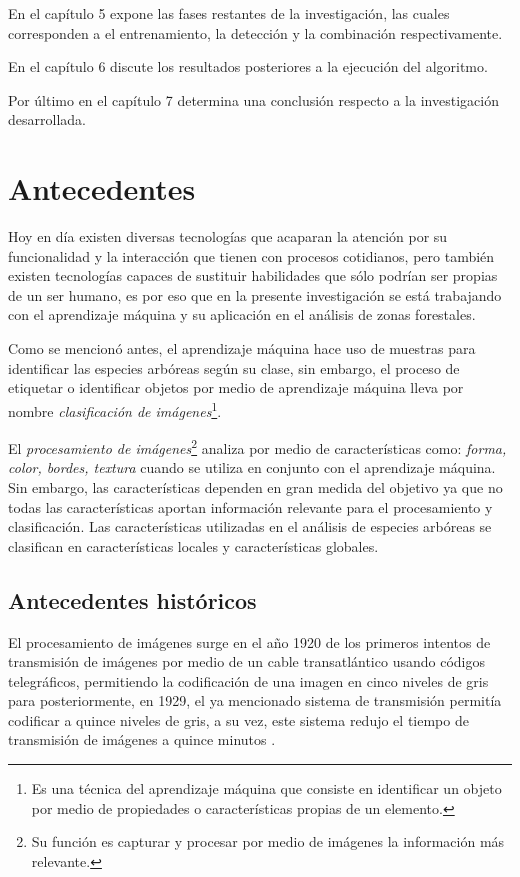 En el capítulo 5 expone las fases restantes de la investigación, las cuales corresponden a el entrenamiento, la detección y la combinación respectivamente.

En el capítulo 6 discute los resultados posteriores a la ejecución del algoritmo.

Por último en el capítulo 7 determina una conclusión respecto a la investigación desarrollada.

\chapter{Antecedentes}
Hoy en día existen diversas tecnologías que acaparan la atención por su funcionalidad y la interacción que tienen con procesos cotidianos, pero también existen tecnologías capaces de sustituir habilidades que sólo podrían ser propias de un ser humano, es por eso que en la presente investigación se está trabajando con el aprendizaje máquina y su aplicación en el análisis de zonas forestales.

Como se mencionó antes, el aprendizaje máquina hace uso de muestras para identificar las especies arbóreas según su clase, sin embargo, el proceso de etiquetar o identificar objetos por medio de aprendizaje máquina lleva por nombre \emph{clasificación de imágenes}\footnote{Es una técnica del aprendizaje máquina que consiste en identificar un objeto por medio de propiedades o características propias de un elemento.}.

El \emph{procesamiento de imágenes}\footnote{Su función es capturar y procesar por medio de imágenes la información más relevante.} analiza por medio de características como: \emph{forma, color, bordes, textura} cuando se utiliza en conjunto con el aprendizaje máquina. Sin embargo, las características dependen en gran medida del objetivo ya que no todas las características aportan información relevante para el procesamiento y clasificación. Las características utilizadas en el análisis de especies arbóreas se clasifican en características locales y características globales.

\section{Antecedentes históricos}
El procesamiento de imágenes surge en el año 1920 de los primeros intentos de transmisión de imágenes por medio de un cable transatlántico usando códigos telegráficos, permitiendo la codificación de una imagen en cinco niveles de gris para posteriormente, en 1929, el ya mencionado sistema de transmisión permitía codificar a quince niveles de gris, a su vez, este sistema redujo el tiempo de transmisión de imágenes a quince minutos \citep{rf4}. 

